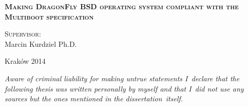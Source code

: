 \begin{center}
{\LARGE{\bfseries\scshape Making DragonFly BSD operating system compliant with the Multiboot specification}}\\\vspace*{1cm}

\begin{flushright}
\begin{minipage}[!h]{5cm}
\large{\scshape Supervisor:}\\ Marcin Kurdziel Ph.D.
\end{minipage}
\end{flushright}

\vfill{\Large Kraków 2014}

\end{center}

\clearpage \newpage

\vspace*{160mm}

{\Large\itshape Aware of criminal liability for making untrue statements I~declare
that the following thesis was written personally by myself and that I~did
not use any sources but the ones mentioned in the dissertation~itself.}

\clearpage \newpage
